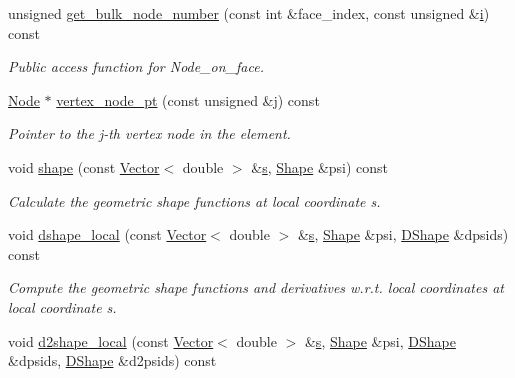 \begin{DoxyCompactItemize}
unsigned \hyperlink{classoomph_1_1TElement_3_012_00_01NNODE__1D_01_4_ae420264d2e271e3aba2403d61f713c54}{get\+\_\+bulk\+\_\+node\+\_\+number} (const int \&face\+\_\+index, const unsigned \&\hyperlink{cfortran_8h_adb50e893b86b3e55e751a42eab3cba82}{i}) const
\begin{DoxyCompactList}\small\item\em Public access function for Node\+\_\+on\+\_\+face. \end{DoxyCompactList}\item 
\hyperlink{classoomph_1_1Node}{Node} $\ast$ \hyperlink{classoomph_1_1TElement_3_012_00_01NNODE__1D_01_4_af6a40f8e3b8051f0b685e64957d47296}{vertex\+\_\+node\+\_\+pt} (const unsigned \&j) const
\begin{DoxyCompactList}\small\item\em Pointer to the j-\/th vertex node in the element. \end{DoxyCompactList}\item 
void \hyperlink{classoomph_1_1TElement_3_012_00_01NNODE__1D_01_4_a21c1b5f546026b5d45c61e25e803feb7}{shape} (const \hyperlink{classoomph_1_1Vector}{Vector}$<$ double $>$ \&\hyperlink{cfortran_8h_ab7123126e4885ef647dd9c6e3807a21c}{s}, \hyperlink{classoomph_1_1Shape}{Shape} \&psi) const
\begin{DoxyCompactList}\small\item\em Calculate the geometric shape functions at local coordinate s. \end{DoxyCompactList}\item 
void \hyperlink{classoomph_1_1TElement_3_012_00_01NNODE__1D_01_4_a9b72261d8b53fa87f530653293163004}{dshape\+\_\+local} (const \hyperlink{classoomph_1_1Vector}{Vector}$<$ double $>$ \&\hyperlink{cfortran_8h_ab7123126e4885ef647dd9c6e3807a21c}{s}, \hyperlink{classoomph_1_1Shape}{Shape} \&psi, \hyperlink{classoomph_1_1DShape}{D\+Shape} \&dpsids) const
\begin{DoxyCompactList}\small\item\em Compute the geometric shape functions and derivatives w.\+r.\+t. local coordinates at local coordinate s. \end{DoxyCompactList}\item 
void \hyperlink{classoomph_1_1TElement_3_012_00_01NNODE__1D_01_4_ab8f127689821bd33998c2fd9ae313dc2}{d2shape\+\_\+local} (const \hyperlink{classoomph_1_1Vector}{Vector}$<$ double $>$ \&\hyperlink{cfortran_8h_ab7123126e4885ef647dd9c6e3807a21c}{s}, \hyperlink{classoomph_1_1Shape}{Shape} \&psi, \hyperlink{classoomph_1_1DShape}{D\+Shape} \&dpsids, \hyperlink{classoomph_1_1DShape}{D\+Shape} \&d2psids) const

\end{DoxyCompactItemize}
